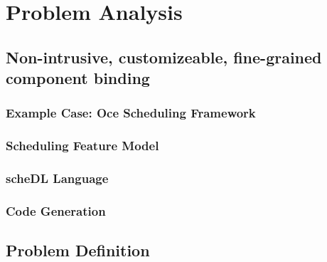 \chapter{Problem Analysis}
\section{Non-intrusive, customizeable, fine-grained component binding}
\subsection{Example Case: Oce Scheduling Framework}
\subsection{Scheduling Feature Model}
\subsection{scheDL Language}
\subsection{Code Generation}
\section{Problem Definition}
